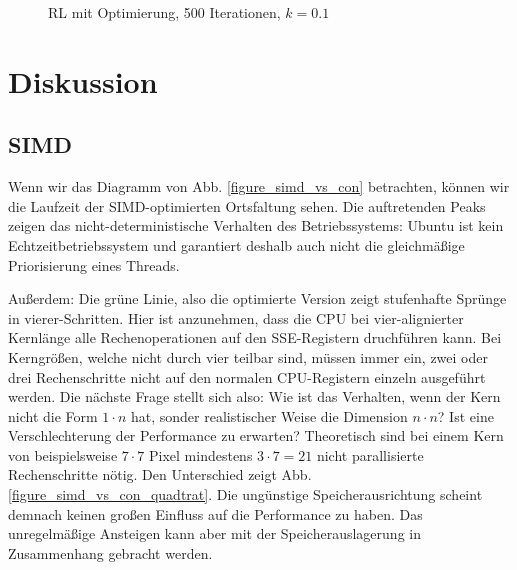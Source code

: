 \documentclass[a4paper,12pt]{article}
\begin{document}
\begin{figure}[h]
\caption{RL mit Optimierung, 500 Iterationen, $k = 0.1$}%
\label{figure_konv_k0_1}
\end{figure}






\newpage

\section{Diskussion}
\subsection{SIMD}
Wenn wir das Diagramm von Abb. \ref{figure_simd_vs_con} betrachten, können wir
die Laufzeit der SIMD-optimierten Ortsfaltung sehen. Die auftretenden Peaks
zeigen das nicht-deterministische Verhalten des Betriebssystems: Ubuntu ist kein
Echtzeitbetriebssystem und garantiert deshalb auch nicht die gleichmäßige
Priorisierung eines Threads. 

Außerdem: Die grüne Linie, also die optimierte Version zeigt stufenhafte
Sprünge in vierer-Schritten. Hier ist anzunehmen, dass die CPU bei
vier-alignierter Kernlänge alle Rechenoperationen auf den SSE-Registern
druchführen kann. Bei Kerngrößen, welche nicht durch vier teilbar sind, müssen
immer ein, zwei oder drei Rechenschritte nicht auf den normalen CPU-Registern
einzeln ausgeführt werden. Die nächste Frage stellt sich also: Wie ist das
Verhalten, wenn der Kern nicht die Form $1 \cdot n$ hat, sonder realistischer
Weise die Dimension $n \cdot n$? Ist eine Verschlechterung der Performance zu
erwarten? Theoretisch sind bei einem Kern von beispielsweise $7 \cdot 7$ Pixel
mindestens $3 \cdot 7 = 21$ nicht parallisierte Rechenschritte nötig. Den
Unterschied zeigt Abb. \ref{figure_simd_vs_con_quadtrat}. Die ungünstige
Speicherausrichtung scheint demnach keinen großen Einfluss auf die Performance
zu haben. Das unregelmäßige Ansteigen kann aber mit der Speicherauslagerung in
Zusammenhang gebracht werden.
 
\end{document}
